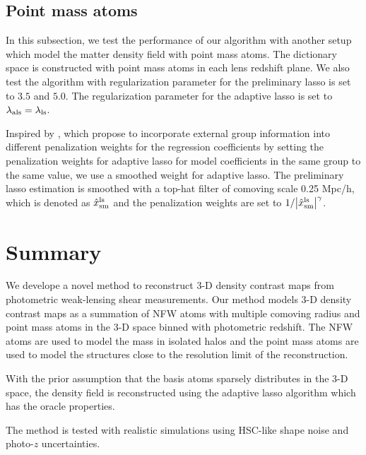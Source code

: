 \documentclass[twocolumn]{aastex62}
\begin{document}
\subsection{Point mass atoms}
\label{subsec:test-pm}
In this subsection, we test the performance of our algorithm with another setup which model the matter density
field with point mass atoms.
The dictionary space is constructed with point mass atoms in each lens redshift plane.
We also test the algorithm with regularization parameter for the preliminary lasso is set to $3.5$ and $5.0$. The
regularization parameter for the adaptive lasso is set to $\lambda_{\rm{als}}=\lambda_{\rm{ls}}$.

Inspired by \citet{structureAdaLasso-Pramanik2020}, which propose to incorporate external group information into
different penalization weights for the regression coefficients by setting the penalization weights for adaptive lasso
for model coefficients in the same group to the same value, we use a smoothed weight for adaptive lasso. The preliminary
lasso estimation is smoothed with a top-hat filter of comoving scale 0.25 Mpc/h, which is denoted as
$\hat{x}^{\rm{ls}}_{\rm{sm}}$ and the penalization weights are set to $1/\abs{\hat{x}^{\rm{ls}}_{\rm{sm}}}^\gamma$.



\section{Summary}
\label{sec:Sum}

We develope a novel method to reconstruct $3$-D density contrast maps from photometric weak-lensing shear measurements.
Our method models $3$-D density contrast maps as a summation of NFW atoms with multiple comoving radius and point mass atoms
in the $3$-D space binned with photometric redshift. The NFW atoms are used to model the mass in isolated halos and the
point mass atoms are used to model the structures close to the resolution limit of the reconstruction.

With the prior assumption that the basis atoms sparsely distributes in the $3$-D space, the density field is reconstructed
using the adaptive lasso algorithm \citep{AdaLASSO-Zou2006} which has the oracle properties.


The method is tested with realistic simulations using HSC-like shape noise and photo-$z$ uncertainties.





\appendix
\end{document}

